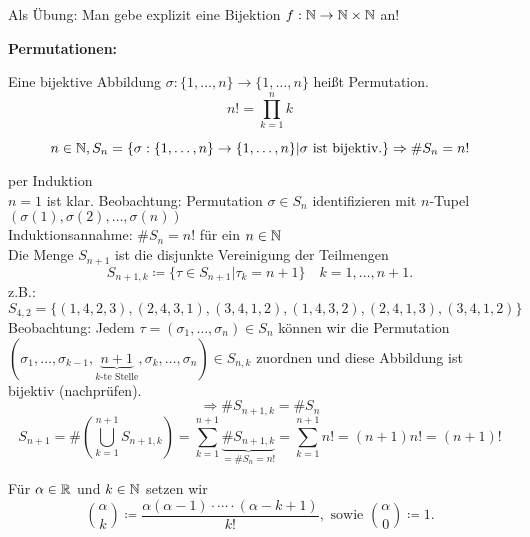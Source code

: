 \documentclass[../ana1.tex]{subfiles}
\begin{document}
\begin{bem}
	Als Übung: Man gebe explizit eine Bijektion \(f : \mathbb{N} \rightarrow \mathbb{N} \times \mathbb{N} \) an!
\end{bem}

\textbf{Permutationen:}
\begin{defi}
	Eine bijektive Abbildung \(\sigma : \{1,\ldots,n\} \rightarrow \{1,\ldots,n\} \) heißt Permutation.
	\[n! = \prod_{k=1}^{n}k \]
\end{defi}

\begin{satz}
	\[n\in\mathbb{N}, S_n = \{\sigma: \{1,\ldots,n\}\rightarrow \{1,\ldots,n\} | \sigma \text{ ist bijektiv.}\} \Rightarrow \# S_n = n! \]
\end{satz}
\begin{bew} per Induktion \\
	\(n = 1 \) ist klar.
	Beobachtung: Permutation \(\sigma \in S_n \) identifizieren mit \(n \)-Tupel \( (\sigma(1), \sigma(2), \ldots, \sigma(n)) \) \\
	Induktionsannahme: \( \# S_n = n! \) für ein \(n\in\mathbb{N} \) \\
	Die Menge \(S_{n+1} \) ist die disjunkte Vereinigung der Teilmengen
	\[S_{n+1, k} \coloneqq \{\tau \in S_{n+1} | \tau_k = n+1 \} \quad k = 1,\ldots, n+1. \]
	z.B.: \[S_{4,2} = \{ (1,4,2,3), (2,4,3,1), (3,4,1,2), (1,4,3,2), (2,4,1,3), (3,4,1,2) \} \]
	Beobachtung: Jedem \(\tau = (\sigma_1,\ldots,\sigma_n)\in S_n \) können wir die Permutation \( (\sigma_1, \ldots, \sigma_{k-1}, \underbrace{n+1}_{k\text{-te Stelle}}, \sigma_k, \ldots, \sigma_n) \in S_{n,k} \) zuordnen und diese Abbildung ist bijektiv (nachprüfen).
	\[\Rightarrow \# S_{n+1,k} = \# S_n \]
	\[ S_{n+1} = \# (\bigcup_{k=1}^{n+1} S_{n+1,k} ) = \sum_{k=1}^{n+1} \underbrace{\# S_{n+1,k}}_{=\#S_n = n!} = \sum_{k=1}^{n+1} n! = (n+1)n! = (n+1)! \]
\end{bew}

\begin{defi}[Binomialkoeffizient]
	Für \(\alpha \in\mathbb{R} \) und \( k\in\mathbb{N} \) setzen wir
	\[ \binom{\alpha}{k} \coloneqq \frac{\alpha(\alpha-1)\cdot\cdots\cdot(\alpha-k+1)}{k!}, \text{ sowie } \binom{\alpha}{0} \coloneqq 1. \]
\end{defi}
\end{document}
